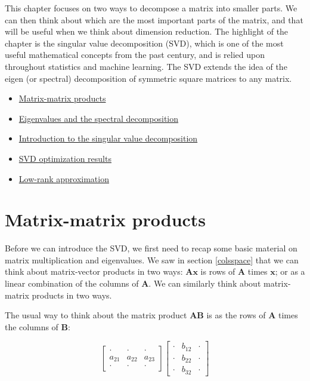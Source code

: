 \documentclass[
]{book}
\providecommand{\tightlist}{%
  \setlength{\itemsep}{0pt}\setlength{\parskip}{0pt}}
\theoremstyle{definition}
\theoremstyle{definition}
\theoremstyle{definition}
\theoremstyle{definition}
\theoremstyle{remark}
\begin{document}
This chapter focuses on two ways to decompose a matrix into smaller parts. We can then think about which are the most important parts of the matrix, and that will be useful when we think about dimension reduction. The highlight of the chapter is the singular value decomposition (SVD), which is one of the most useful mathematical concepts from the past century, and is relied upon throughout statistics and machine learning. The SVD extends the idea of the eigen (or spectral) decomposition of symmetric square matrices to any matrix.

\begin{itemize}
\tightlist
\item
  \href{https://mediaspace.nottingham.ac.uk/media/Matrix-matrix+products/1_kelw2beu}{Matrix-matrix products}
\item
  \href{https://mediaspace.nottingham.ac.uk/media/Eigenvalues+and+the+spectral+decomposition/1_drbz1eg8}{Eigenvalues and the spectral decomposition}
\item
  \href{https://mediaspace.nottingham.ac.uk/media/Singular+value+decompositionA+introduction/1_okyjnqic}{Introduction to the singular value decomposition}
\item
  \href{https://mediaspace.nottingham.ac.uk/media/Singular+value+decompositionA+optimization+results/1_9jv8zfw0}{SVD optimization results}
\item
  \href{https://mediaspace.nottingham.ac.uk/media/Singular+value+decompositionA+low+rank+approximation/1_vwbtjdzo}{Low-rank approximation}
\end{itemize}

\section{Matrix-matrix products}\label{matrix-matrix}

Before we can introduce the SVD, we first need to recap some basic material on matrix multiplication and eigenvalues.
We saw in section \ref{colsspace} that we can think about matrix-vector products in two ways: \(\mathbf A\mathbf x\) is rows of \(\mathbf A\) times \(\mathbf x\); or as a linear combination of the columns of \(\mathbf A\). We can similarly think about matrix-matrix products in two ways.

The usual way to think about the matrix product \(\mathbf A\mathbf B\) is as the rows of \(\mathbf A\) times the columns of \(\mathbf B\):

\[\left[ \begin{array}{ccc}
\cdot & \cdot &\cdot\\
a_{21}&a_{22}&a_{23}\\
\cdot & \cdot &\cdot
\end{array}
\right]\left[\begin{array}{ccc}
\cdot & b_{12} &\cdot\\
\cdot&b_{22}&\cdot\\
\cdot & b_{32} &\cdot
\end{array}
\right]\]
\end{document}
